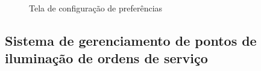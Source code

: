 \documentclass[
	article,			%
	11pt,				%
	oneside,			%
	a4paper,			%
	english,			%
	brazil,				%
	sumario=tradicional
	]{abntex2}
\begin{document}
\begin{figure}[!htbp]
 \centering
  \begin{minipage}{0.4\textwidth}
    \centering
    \caption{\label{android-tela-preferencias}Tela de configuração de preferências}
  \end{minipage}
\end{figure}

\subsection{Sistema de gerenciamento de pontos de iluminação de ordens de serviço}
\end{document}

